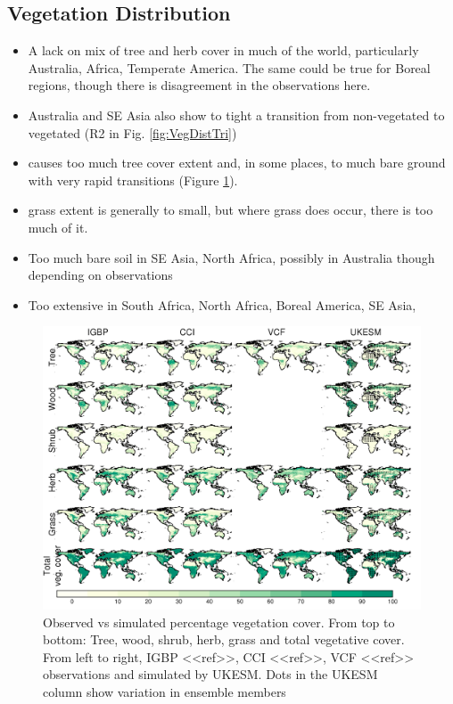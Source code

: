 \documentclass[bg, manuscript]{copernicus}
\begin{document}
\subsection{Vegetation Distribution}
\begin{itemize}
    \item A lack on mix of tree and herb cover in much of the world, particularly Australia, Africa, Temperate America. The same could be true for Boreal regions, though there is disagreement in the observations here.
    \item Australia and SE Asia also show to tight a transition from non-vegetated to vegetated (R2 in Fig. \ref{fig:VegDistTri})
    \item causes too much tree cover extent and, in some places, to much bare ground with very rapid transitions (Figure  \ref{fig:VegDistMap}).
    \item grass extent is generally to small, but where grass does occur, there is too much of it.
    \item Too much bare soil in SE Asia, North Africa, possibly in Australia though depending on observations
    \item Too extensive in South Africa, North Africa, Boreal America, SE Asia, 
\end{itemize}


\begin{figure}[t]
\includegraphics[width=12cm]{figs/VegDist/vegDist.png}
\caption{Observed vs simulated percentage vegetation cover. From top to bottom: Tree, wood, shrub, herb, grass and total vegetative cover. From left to right, IGBP <<ref>>, CCI <<ref>>, VCF <<ref>> observations and simulated by UKESM. Dots in the UKESM column show variation in ensemble members \label{fig:VegDistMap}}
\end{figure}
\end{document}
